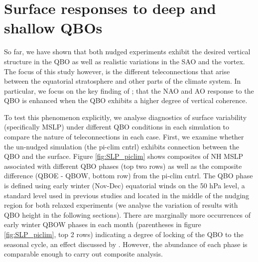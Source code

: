 \section{Surface responses to deep and shallow QBOs}
\label{sec:MSLP_responses}
So far, we have shown that both nudged experiments exhibit the desired vertical structure in the QBO as well as realistic variations in the SAO and the vortex. The focus of this study however, is the different teleconnections that arise between the equatorial stratosphere and other parts of the climate system. In particular, we focus on the key finding of \cite{andrewsObserved2019d}; that the NAO and AO response to the QBO is enhanced when the QBO exhibits a higher degree of vertical coherence. 

To test this phenomenon explicitly, we analyse diagnostics of surface variability (specifically MSLP) under different QBO conditions in each simulation to compare the nature of teleconnections in each case. First, we examine whether the un-nudged simulation (the pi-clim cntrl) exhibits connection between the QBO and the surface. Figure \ref{fig:SLP_piclim} shows composites of NH MSLP associated with different QBO phases (top two rows) as well as the composite difference (QBOE - QBOW, bottom row) from the pi-clim cntrl. The QBO phase is defined using early winter (Nov-Dec) equatorial winds on the 50 hPa level, a standard level used in previous studies \citep{ansteyHighlatitude2014b} and located in the middle of the nudging region for both relaxed experiments (we analyse the variation of results with QBO height in the following sections). There are marginally more occurrences of early winter QBOW phases in each month (parentheses in figure \ref{fig:SLP_piclim}, top 2 rows) indicating a degree of locking of the QBO to the seasonal cycle, an effect discussed by \cite{rajendranSynchronisation2016b}. However, the abundance of each phase is comparable enough to carry out composite analysis.

